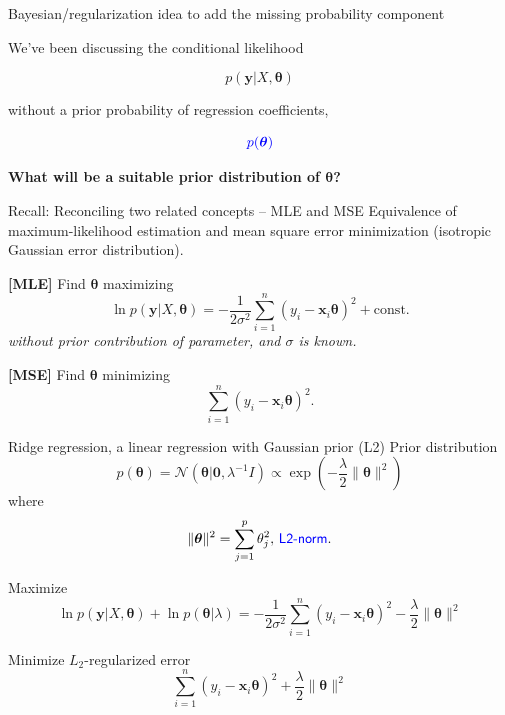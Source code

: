 \documentclass[
  ignorenonframetext,
  aspectratio=169]{beamer}
\begin{document}
\begin{frame}{Bayesian/regularization idea to add the missing
probability component}
\protect\hypertarget{bayesianregularization-idea-to-add-the-missing-probability-component}{}
\large

We've been discussing the conditional likelihood

\[p(\mathbf{y}|X,\boldsymbol{\theta})\]

without a prior probability of regression coefficients,

\[{\color{blue} p(\boldsymbol{\theta})}\]

\textbf{What will be a suitable prior distribution of
\(\boldsymbol{\theta}\)?}
\end{frame}

\begin{frame}{Recall: Reconciling two related concepts -- MLE and MSE}
\protect\hypertarget{recall-reconciling-two-related-concepts-mle-and-mse}{}
Equivalence of maximum-likelihood estimation and mean square error
minimization (isotropic Gaussian error distribution).

\vfill

\textbf{{[}MLE{]}} Find \({\boldsymbol{\theta}}\) maximizing \[
\ln p(\mathbf{y}|X,\boldsymbol{\theta})
= - \frac{1}{2\sigma^{2}} \sum_{i=1}^{n} (y_{i} - \mathbf{x}_{i} \boldsymbol{\theta})^{2} + \textrm{const.}
\] \emph{without prior contribution of parameter, and \(\sigma\) is
known.}

\vfill

\textbf{{[}MSE{]}} Find \(\boldsymbol{\theta}\) minimizing \[
\sum_{i=1}^{n} (y_{i} - \mathbf{x}_{i} \boldsymbol{\theta})^{2}.
\]
\end{frame}

\begin{frame}{Ridge regression, a linear regression with Gaussian prior
(L2)}
\protect\hypertarget{ridge-regression-a-linear-regression-with-gaussian-prior-l2}{}
Prior distribution \[
p(\boldsymbol{\theta}) = \mathcal{N}\!\left(\boldsymbol{\theta}|\mathbf{0}, \lambda^{-1} I\right) \propto \exp\left(-\frac{\lambda}{2}\|\boldsymbol{\theta}\|^{2}\right)
\] where \large
\[\|\boldsymbol{\theta}\|^{2} = \sum_{j=1}^{p} \theta_{j}^{2},\,\textsf{\color{blue}L2-norm}.\]

\normalsize

Maximize \[
\ln p(\mathbf{y}|X,\boldsymbol{\theta}) + \ln p(\boldsymbol{\theta}|\lambda)
= - \frac{1}{2\sigma^{2}} \sum_{i=1}^{n} (y_{i} - \mathbf{x}_{i} \boldsymbol{\theta})^{2}
- \frac{\lambda}{2} \|\boldsymbol{\theta}\|^{2}
\]

Minimize \(L_{2}\)-regularized error \[
\sum_{i=1}^{n} (y_{i} - \mathbf{x}_{i} \boldsymbol{\theta})^{2}
+ \frac{\lambda}{2} \|\boldsymbol{\theta}\|^{2}
\]
\end{frame}
\end{document}
